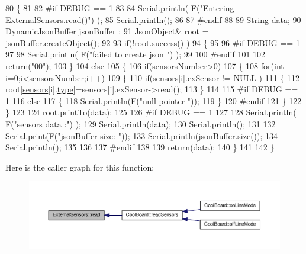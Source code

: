 \begin{DoxyCode}
80 \{
81 
82 \textcolor{preprocessor}{#if DEBUG == 1}
83 
84     Serial.println( F(\textcolor{stringliteral}{"Entering ExternalSensors.read()"}) );
85     Serial.println();
86 
87 \textcolor{preprocessor}{#endif }
88 
89     String data;
90     DynamicJsonBuffer  jsonBuffer ;
91     JsonObject& root = jsonBuffer.createObject();
92 
93     \textcolor{keywordflow}{if}(!root.success() )
94     \{
95  
96 \textcolor{preprocessor}{    #if DEBUG == 1}
97 
98         Serial.println( F(\textcolor{stringliteral}{"failed to create json "}) );
99     
100 \textcolor{preprocessor}{    #endif }
101 
102         \textcolor{keywordflow}{return}(\textcolor{stringliteral}{"00"});
103     \}
104     \textcolor{keywordflow}{else}
105     \{
106         \textcolor{keywordflow}{if}(\hyperlink{class_external_sensors_a58e4fbf9adeae787d92be5fa33043b5d}{sensorsNumber}>0)
107         \{
108             \textcolor{keywordflow}{for}(\textcolor{keywordtype}{int} i=0;i<\hyperlink{class_external_sensors_a58e4fbf9adeae787d92be5fa33043b5d}{sensorsNumber};i++)
109             \{
110                 \textcolor{keywordflow}{if}(\hyperlink{class_external_sensors_a284233f884fcf00154a44740cf1d9e1e}{sensors}[i].exSensor != NULL )
111                 \{
112                     root[\hyperlink{class_external_sensors_a284233f884fcf00154a44740cf1d9e1e}{sensors}[i].\hyperlink{struct_external_sensors_1_1sensor_a6acfdb02c742c2110d7bd2b5d9fce9e7}{type}]=sensors[i].exSensor->read();       
113                 \}
114             
115 \textcolor{preprocessor}{            #if DEBUG == 1}
116                 \textcolor{keywordflow}{else}
117                 \{
118                     Serial.println(F(\textcolor{stringliteral}{"null pointer "}));
119                 \}
120 \textcolor{preprocessor}{            #endif  }
121             \}
122         \}   
123         
124         root.printTo(data);
125     
126 \textcolor{preprocessor}{    #if DEBUG == 1}
127 
128         Serial.println( F(\textcolor{stringliteral}{"sensors data :"}) );
129         Serial.println(data);
130         Serial.println();
131 
132         Serial.print(F(\textcolor{stringliteral}{"jsonBuffer size: "}));
133         Serial.println(jsonBuffer.size());
134         Serial.println();
135 
136     
137 \textcolor{preprocessor}{    #endif}
138     
139         \textcolor{keywordflow}{return}(data);
140     \}
141 
142 \}
\end{DoxyCode}
Here is the caller graph for this function\+:\nopagebreak
\begin{figure}[H]
\begin{center}
\leavevmode
\includegraphics[width=350pt]{d1/d2f/class_external_sensors_a53177b81eca3be89508b5511ddcd00fc_icgraph}
\end{center}
\end{figure}


